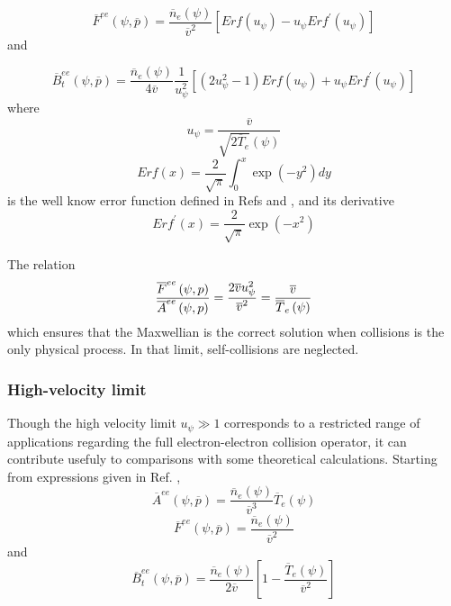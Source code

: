 \begin{equation}
\overline{F}^{ee}\left( \psi ,\overline{p}\right) =\frac{\overline{n}%
_{e}\left( \psi \right) }{\overline{v}^{2}}\left[ Erf\left( u_{\psi }\right)
-u_{\psi }Erf^{\prime }\left( u_{\psi }\right) \right]
\end{equation}
and

\begin{equation}
\overline{B}_{t}^{ee}\left( \psi ,\overline{p}\right) =\frac{\overline{n}%
_{e}\left( \psi \right) }{4\overline{v}}\frac{1}{u_{\psi }^{2}}\left[ \left(
2u_{\psi }^{2}-1\right) Erf\left( u_{\psi }\right) +u_{\psi }Erf^{\prime
}\left( u_{\psi }\right) \right]
\end{equation}
where
\begin{equation}
u_{\psi }=\frac{\overline{v}}{\sqrt{2\overline{T}_{e}}\left( \psi \right) }
\end{equation}
\begin{equation}
Erf(x)=\frac{2}{\sqrt{\pi }}\int_{0}^{x}\exp \left( -y^{2}\right) dy
\end{equation}
is the well know error function defined in Refs \cite{gra65} and \cite{aba70}
, and its derivative
\begin{equation}
Erf^{\prime }(x)=\frac{2}{\sqrt{\pi }}\exp \left( -x^{2}\right)
\end{equation}

The relation
\begin{equation}
\frac{\overline{F}^{ee}\left( \psi ,p\right) }{\overline{A}^{ee}\left( \psi
,p\right) }=\frac{2\overline{v}u_{\psi }^{2}}{\overline{v}^{2}}=\frac{%
\overline{v}}{\overline{T}_{e}\left( \psi \right) }  \label{ratioAF}
\end{equation}
which ensures that the Maxwellian is the correct solution when collisions is
the only physical process. In that limit, self-collisions are neglected.

\subsubsection{High-velocity limit}

Though the high velocity limit $u_{\psi }\gg 1$ corresponds to a restricted
range of applications regarding the full electron-electron collision
operator, it can contribute usefuly to comparisons with some theoretical
calculations. Starting from expressions given in Ref. \cite{kar86},
\begin{equation}
\overline{A}^{ee}\left( \psi ,\overline{p}\right) =\frac{\overline{n}%
_{e}\left( \psi \right) }{\overline{v}^{3}}\overline{T}_{e}\left( \psi
\right)   \label{Ahighvelocity}
\end{equation}
\begin{equation}
\overline{F}^{ee}\left( \psi ,\overline{p}\right) =\frac{\overline{n}%
_{e}\left( \psi \right) }{\overline{v}^{2}}
\end{equation}
and
\begin{equation}
\overline{B}_{t}^{ee}\left( \psi ,\overline{p}\right) =\frac{\overline{n}%
_{e}\left( \psi \right) }{2\overline{v}}\left[ 1-\frac{\overline{T}%
_{e}\left( \psi \right) }{\overline{v}^{2}}\right]
\end{equation}

